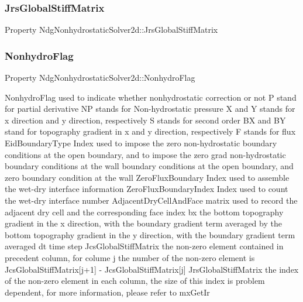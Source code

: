\subsubsection{\texorpdfstring{Jrs\+Global\+Stiff\+Matrix}{JrsGlobalStiffMatrix}}
{\footnotesize\ttfamily Property Ndg\+Nonhydrostatic\+Solver2d\+::\+Jrs\+Global\+Stiff\+Matrix}

\mbox{\label{class_ndg_nonhydrostatic_solver2d_a6236ae6cba4d05c2b4efcf53f488489d}} 
\subsubsection{\texorpdfstring{Nonhydro\+Flag}{NonhydroFlag}}
{\footnotesize\ttfamily Property Ndg\+Nonhydrostatic\+Solver2d\+::\+Nonhydro\+Flag}

Nonhydro\+Flag used to indicate whether nonhydrostatic correction or not P stand for partial derivative NP stands for Non-\/hydrostatic pressure X and Y stands for x direction and y direction, respectively S stands for second order BX and BY stand for topography gradient in x and y direction, respectively F stands for flux Eid\+Boundary\+Type Index used to impose the zero non-\/hydrostatic boundary conditions at the open boundary, and to impose the zero grad non-\/hydrostatic boundary conditions at the wall boundary conditions at the open boundary, and zero boundary condition at the wall Zero\+Flux\+Boundary Index used to assemble the wet-\/dry interface information Zero\+Flux\+Boundary\+Index Index used to count the wet-\/dry interface number Adjacent\+Dry\+Cell\+And\+Face matrix used to record the adjacent dry cell and the corresponding face index bx the bottom topography gradient in the x direction, with the boundary gradient term averaged by the bottom topography gradient in the y direction, with the boundary gradient term averaged dt time step Jcs\+Global\+Stiff\+Matrix the non-\/zero element contained in precedent column, for colume j the number of the non-\/zero element is Jcs\+Global\+Stiff\+Matrix\mbox{[}j+1\mbox{]} -\/ Jcs\+Global\+Stiff\+Matrix\mbox{[}j\mbox{]} Jrs\+Global\+Stiff\+Matrix the index of the non-\/zero element in each column, the size of this index is problem dependent, for more information, please refer to mx\+Get\+Ir \mbox{\label{class_ndg_nonhydrostatic_solver2d_ab23f0fef0b83b0a81a23ee77020f0323}} 
